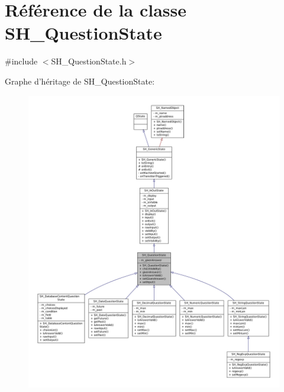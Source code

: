 \hypertarget{classSH__QuestionState}{\section{Référence de la classe S\-H\-\_\-\-Question\-State}
\label{classSH__QuestionState}
}


{\ttfamily \#include $<$S\-H\-\_\-\-Question\-State.\-h$>$}



Graphe d'héritage de S\-H\-\_\-\-Question\-State\-:\nopagebreak
\begin{figure}[H]
\begin{center}
\leavevmode
\includegraphics[width=350pt]{classSH__QuestionState__inherit__graph}
\end{center}
\end{figure}


